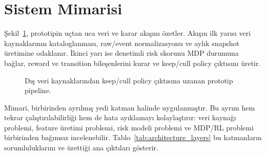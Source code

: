 \documentclass[conference]{IEEEtran}
\begin{document}
\section{Sistem Mimarisi}
Şekil~\ref{fig:pipeline}, prototipin uçtan uca veri ve karar akışını özetler.
Akışın ilk yarısı veri kaynaklarının kataloglanması, raw/event normalizasyonu
ve aylık snapshot üretimine odaklanır. İkinci yarı ise denetimli risk skorunu
MDP durumuna bağlar, reward ve transition bileşenlerini kurar ve keep/cull
policy çıktısını üretir.

\begin{figure}[!t]
\centering
{}
\caption{Dış veri kaynaklarından keep/cull policy çıktısına uzanan prototip
pipeline.}
\label{fig:pipeline}
\end{figure}

Mimari, birbirinden ayrılmış yedi katman halinde uygulanmıştır. Bu ayrım hem
tekrar çalıştırılabilirliği hem de hata ayıklamayı kolaylaştırır: veri kaynağı
problemi, feature üretimi problemi, risk modeli problemi ve MDP/RL problemi
birbirinden bağımsız incelenebilir. Tablo~\ref{tab:architecture_layers} bu
katmanların sorumluluklarını ve ürettiği ana çıktıları gösterir.
\end{document}
